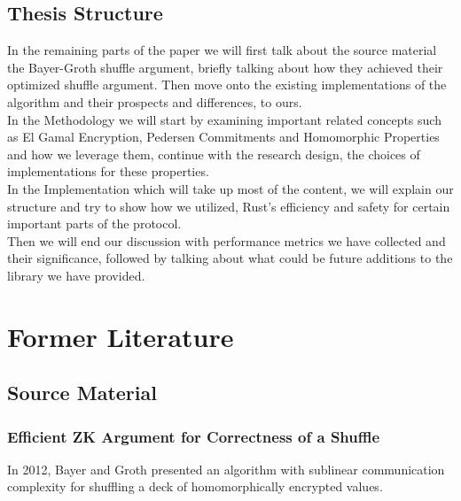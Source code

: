 \documentclass[12pt,a4paper]{report}
\begin{document}
\section{Thesis Structure}
In the remaining parts of the paper we will first talk about the source material the Bayer-Groth
shuffle argument, briefly talking about how they achieved their optimized shuffle argument.
Then move onto the existing implementations of the algorithm and their prospects and differences,
to ours. \\

In the Methodology we will start by examining important related concepts such as El Gamal Encryption,
Pedersen Commitments and Homomorphic Properties and how we leverage them, continue with 
the research design, the choices of implementations for these properties.\\

In the Implementation which will take up most of the content, we will explain our structure and 
try to show how we utilized, Rust's efficiency and safety for certain important parts of the protocol.\\

Then we will end our discussion with performance metrics we have collected and their significance,
followed by talking about what could be future additions to the library we have provided.




\chapter{Former Literature}
\section{Source Material}
\subsection{Efficient ZK Argument for Correctness of a Shuffle}
In 2012, Bayer and Groth\cite{bgshuffle} presented an algorithm with sublinear 
communication complexity for shuffling a deck of homomorphically encrypted values.
\end{document}
